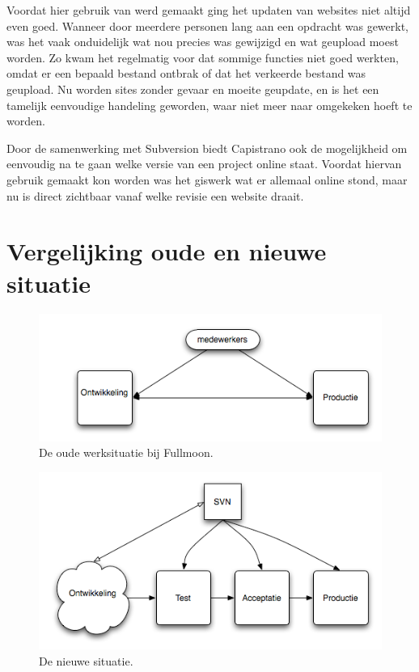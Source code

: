 Voordat hier gebruik van werd gemaakt ging het updaten van websites niet altijd even goed. Wanneer door meerdere personen lang aan een opdracht was gewerkt, was het vaak onduidelijk wat nou precies was gewijzigd en wat geupload moest worden. Zo kwam het regelmatig voor dat sommige functies niet goed werkten, omdat er een bepaald bestand ontbrak of dat het verkeerde bestand was geupload. Nu worden sites zonder gevaar en moeite geupdate, en is het een tamelijk eenvoudige handeling geworden, waar niet meer naar omgekeken hoeft te worden.

Door de samenwerking met Subversion biedt Capistrano ook de mogelijkheid om eenvoudig na te gaan welke versie van een project online staat. Voordat hiervan gebruik gemaakt kon worden was het giswerk wat er allemaal online stond, maar nu is direct zichtbaar vanaf welke revisie een website draait. 

\section{Vergelijking oude en nieuwe situatie}

\begin{figure}
  \centering
  \includegraphics[scale=0.70]{situatie_oud.png}
  \caption[Oude situatie.]{De oude werksituatie bij Fullmoon.}
\end{figure}

\begin{figure}
  \centering
  \includegraphics[scale=0.70]{situatie_nieuw.png}
  \caption[Nieuwe situatie.]{De nieuwe situatie.}
\end{figure}

